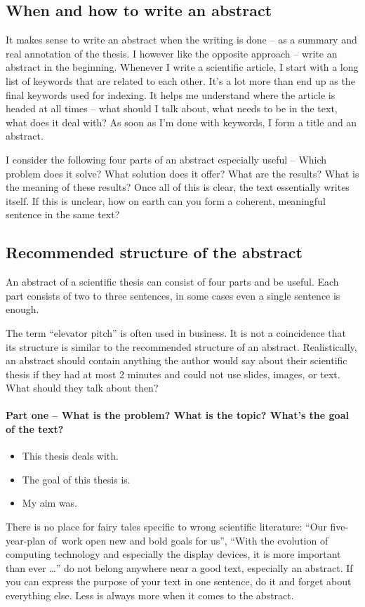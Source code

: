 \subsection*{When and how to write an abstract}
It makes sense to write an abstract when the writing is done -- as a summary and real annotation of the thesis.
I however like the opposite approach -- write an abstract in the beginning. Whenever I write a scientific article, I start with a long list of keywords that are related to each other. It's a lot more than end up as the final keywords used for indexing. It helps me understand where the article is headed at all times -- what should I talk about, what needs to be in the text, what does it deal with? As soon as I'm done with keywords, I form a title and an abstract.

I consider the following four parts of an abstract especially useful -- Which problem does it solve? What solution does it offer? What are the results? What is the meaning of these results? Once all of this is clear, the text essentially writes itself. If this is unclear, how on earth can you form a coherent, meaningful sentence in the same text?


\subsection*{Recommended structure of the abstract}
An abstract of a scientific thesis can consist of four parts and be useful. Each part consists of two to three sentences, in some cases even a single sentence is enough.

The term ``elevator pitch'' is often used in business. It is not a coincidence that its structure is similar to the recommended structure of an abstract. Realistically, an abstract should contain anything the author would say about their scientific thesis if they had at most 2 minutes and could not use slides, images, or text. What should they talk about then?

\paragraph{Part one -- What is the problem? What is the topic? What's the goal of the text?}
\begin{itemize}
  \item{This thesis deals with.}
  \item{The goal of this thesis is.}
  \item{My aim was.}
\end{itemize}
There is no place for fairy tales specific to wrong scientific literature: ``Our five-year-plan of~work open new and bold goals for us'', ``With the evolution of computing technology and especially the display devices, it is more important than ever \ldots'' do not belong anywhere near a good text, especially an abstract. If you can express the purpose of your text in one sentence, do it and forget about everything else. Less is always more when it comes to the abstract.

